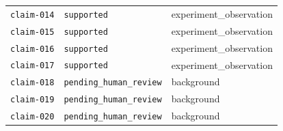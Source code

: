 \documentclass[UTF8]{ctexart}
\begin{document}
\begin{longtable}{@{}>{\raggedright\arraybackslash}p{}>{\raggedright\arraybackslash}p{}>{\raggedright\arraybackslash}p{}@{}}
\texttt{\scriptsize claim-\allowbreak{}014} & \texttt{\scriptsize supported} & experiment\_\allowbreak{}observation \\
\texttt{\scriptsize claim-\allowbreak{}015} & \texttt{\scriptsize supported} & experiment\_\allowbreak{}observation \\
\texttt{\scriptsize claim-\allowbreak{}016} & \texttt{\scriptsize supported} & experiment\_\allowbreak{}observation \\
\texttt{\scriptsize claim-\allowbreak{}017} & \texttt{\scriptsize supported} & experiment\_\allowbreak{}observation \\
\texttt{\scriptsize claim-\allowbreak{}018} & \texttt{\scriptsize pending\_\allowbreak{}human\_\allowbreak{}review} & background \\
\texttt{\scriptsize claim-\allowbreak{}019} & \texttt{\scriptsize pending\_\allowbreak{}human\_\allowbreak{}review} & background \\
\texttt{\scriptsize claim-\allowbreak{}020} & \texttt{\scriptsize pending\_\allowbreak{}human\_\allowbreak{}review} & background \\
\bottomrule
\end{longtable}
\end{document}
